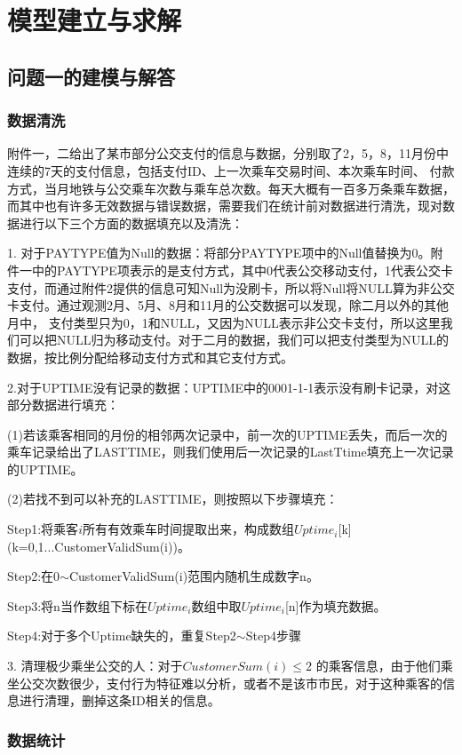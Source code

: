 \documentclass[withoutpreface,bwprint]{cumcmthesis} %
\begin{document}
\section{模型建立与求解}
\subsection{问题一的建模与解答}
\subsubsection{数据清洗}
附件一，二给出了某市部分公交支付的信息与数据，分别取了2，5，8，11月份中连续的7天的支付信息，包括支付ID、上一次乘车交易时间、本次乘车时间、
付款方式，当月地铁与公交乘车次数与乘车总次数。每天大概有一百多万条乘车数据，而其中也有许多无效数据与错误数据，需要我们在统计前对数据进行清洗，现对数据进行以下三个方面的数据填充以及清洗：

1. 对于PAYTYPE值为Null的数据：将部分PAYTYPE项中的Null值替换为0。附件一中的PAYTYPE项表示的是支付方式，其中0代表公交移动支付，1代表公交卡支付，而通过附件2提供的信息可知Null为没刷卡，所以将Null将NULL算为非公交卡支付。通过观测2月、5月、8月和11月的公交数据可以发现，除二月以外的其他月中，
支付类型只为0，1和NULL，又因为NULL表示非公交卡支付，所以这里我们可以把NULL归为移动支付。对于二月的数据，我们可以把支付类型为NULL的数据，按比例分配给移动支付方式和其它支付方式。

2.对于UPTIME没有记录的数据：UPTIME中的0001-1-1表示没有刷卡记录，对这部分数据进行填充：

(1)若该乘客相同的月份的相邻两次记录中，前一次的UPTIME丢失，而后一次的乘车记录给出了LASTTIME，则我们使用后一次记录的LastTtime填充上一次记录的UPTIME。

(2)若找不到可以补充的LASTTIME，则按照以下步骤填充：

Step1:将乘客$i$所有有效乘车时间提取出来，构成数组$Uptime_i$[k](k=0,1...CustomerValidSum(i))。

Step2:在0$\sim$CustomerValidSum(i)范围内随机生成数字n。

Step3:将n当作数组下标在$Uptime_i$数组中取$Uptime_i$[n]作为填充数据。

Step4:对于多个Uptime缺失的，重复Step2$\sim$Step4步骤

3. 清理极少乘坐公交的人：对于$CustomerSum(i)\leq2$ 的乘客信息，由于他们乘坐公交次数很少，支付行为特征难以分析，或者不是该市市民，对于这种乘客的信息进行清理，删掉这条ID相关的信息。

\subsubsection{数据统计}
\end{document}
